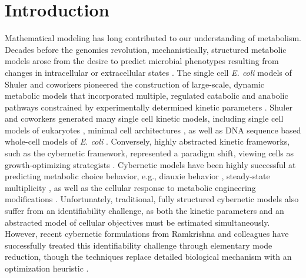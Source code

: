 \documentclass[processes,article,accept,moreauthors,pdftex,12pt,a4paper]{mdpi}
\begin{document}
\section{Introduction} 

Mathematical modeling has long contributed to our understanding of metabolism. Decades before the genomics revolution, mechanistically, structured metabolic models arose from the desire to predict microbial phenotypes resulting from changes in intracellular or extracellular states \citep{1976_fredrickson_BiotechBioeng}. 
The single cell \textit{E. coli} models of Shuler and coworkers pioneered the construction of large-scale, dynamic metabolic models that incorporated multiple, regulated catabolic and anabolic pathways constrained by experimentally determined kinetic parameters \citep{1984_domach_shuler_BiotechBioeng_01}. 
Shuler and coworkers generated many single cell kinetic models, including single cell models of eukaryotes \citep{1989_steinmeyer_shuler_ChemEngSci,1992_wu_shuler_AnnNYAcadSci}, minimal cell architectures \citep{2004_castellanos_shuler_PNAS}, as well as DNA sequence based whole-cell models of \textit{E. coli} \citep{2008_atlas_shuler_IETSysBio}.
Conversely, highly abstracted kinetic frameworks, such as the cybernetic framework, represented a paradigm shift, viewing cells as growth-optimizing strategists \citep{1985_dhurjati_ramkrishna_tsao_BiotechBioeng}. 
Cybernetic models have been highly successful at predicting metabolic choice behavior, e.g., diauxie behavior \citep{1986_kompala_ramkrishna_tsao_BiotechBioeng}, steady-state multiplicity \citep{2012_kim_ramkrishna_BiotechProg}, as well as the cellular response to metabolic engineering modifications \citep{1999_varner_ramkrishna_MetaEng}. 
Unfortunately, traditional, fully structured cybernetic models also suffer from an identifiability challenge, as both the kinetic parameters and an abstracted model of cellular objectives must be estimated simultaneously. 
However, recent cybernetic formulations from Ramkrishna and colleagues have successfully treated this identifiability challenge through elementary mode reduction, though the techniques replace detailed biological mechanism with an optimization heuristic \cite{2009_song_ramkrishna_BiotechBioeng,Song:2011aa}. 
\end{document}
